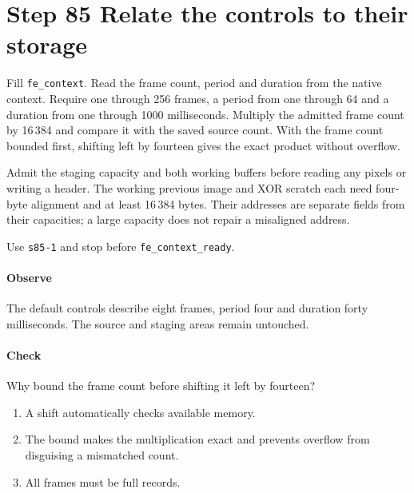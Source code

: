 \section{Step 85 Relate the controls to their storage}
Fill \texttt{fe\_context}. Read the frame count, period and duration from the native context. Require one through 256 frames, a period from one through 64 and a duration from one through 1000 milliseconds. Multiply the admitted frame count by 16\,384 and compare it with the saved source count. With the frame count bounded first, shifting left by fourteen gives the exact product without overflow.

Admit the staging capacity and both working buffers before reading any pixels or writing a header. The working previous image and XOR scratch each need four-byte alignment and at least 16\,384 bytes. Their addresses are separate fields from their capacities; a large capacity does not repair a misaligned address.

Use \texttt{s85-1} and stop before \texttt{fe\_context\_ready}.

\paragraph{Observe} The default controls describe eight frames, period four and duration forty milliseconds. The source and staging areas remain untouched.

\paragraph{Check} Why bound the frame count before shifting it left by fourteen?
\begin{enumerate}[label=\Alph*.]
  \item A shift automatically checks available memory.
  \item The bound makes the multiplication exact and prevents overflow from disguising a mismatched count.
  \item All frames must be full records.
\end{enumerate}
